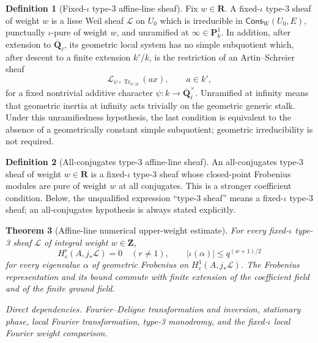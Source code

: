 \documentclass[10pt]{article}
\newtheorem{theorem}{Theorem}[section]
\theoremstyle{definition}
\newtheorem{definition}[theorem]{Definition}
\newcommand{\Qlb}{\overline{\mathbf Q}_\ell}
\newcommand{\dep}[1]{\par\smallskip\noindent\textit{Direct dependencies.} #1\par}
\begin{document}
\begin{definition}[Fixed-\(\iota\) type-3 affine-line sheaf]
Fix \(w\in\mathbf R\).  A fixed-\(\iota\) type-3 sheaf of weight \(w\) is
a lisse Weil sheaf \(\mathcal L\) on
\(U_0\) which is irreducible in
\(\mathsf{Cons}_{\mathrm W}(U_0,E)\), punctually \(\iota\)-pure of weight
\(w\), and unramified at \(\infty\in\mathbf P^1_k\).  In addition, after
extension to \(\Qlb\), its geometric local system has no simple subquotient
which, after descent to a finite extension \(k'/k\), is the restriction of
an Artin--Schreier sheaf
\[
             \mathcal L_{\psi\circ\operatorname{Tr}_{k'/k}}(ax),
             \qquad a\in k',
\]
for a fixed nontrivial additive character \(\psi:k\to\Qlb^\times\).
Unramified at infinity means that geometric inertia at infinity acts
trivially on the geometric generic stalk.  Under this unramifiedness
hypothesis, the last condition is equivalent to the absence of a
geometrically constant simple subquotient; geometric irreducibility is not
required.
\end{definition}

\begin{definition}[All-conjugates type-3 affine-line sheaf]
An all-conjugates type-3 sheaf of weight \(w\in\mathbf R\) is a
fixed-\(\iota\) type-3 sheaf whose closed-point Frobenius modules are pure
of weight \(w\) at all conjugates.  This is a stronger coefficient
condition.  Below, the unqualified expression ``type-3 sheaf'' means a
fixed-\(\iota\) type-3 sheaf; an all-conjugates hypothesis is always stated
explicitly.
\end{definition}

\begin{theorem}[Affine-line numerical upper-weight estimate]
For every fixed-\(\iota\) type-3 sheaf \(\mathcal L\) of integral weight
\(w\in\mathbf Z\),
\[
 H_c^r(A,j_*\mathcal L)=0\quad(r\ne1),
 \qquad
 |\iota(\alpha)|\le q^{(w+1)/2}
\]
for every eigenvalue \(\alpha\) of geometric Frobenius on
\(H_c^1(A,j_*\mathcal L)\).
The Frobenius representation and its bound commute with finite extension of
the coefficient field and of the finite ground field.
\dep{Fourier--Deligne transformation and inversion, stationary phase,
local Fourier transformation, type-3 monodromy, and the fixed-\(\iota\)
local Fourier weight comparison.}
\end{theorem}
\end{document}
